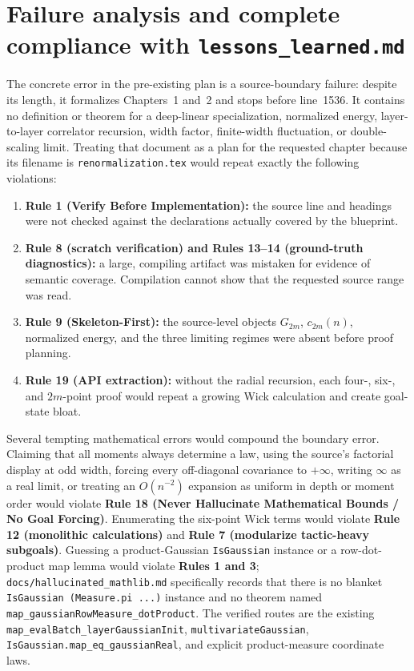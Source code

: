 \section{Failure analysis and complete compliance with \texttt{lessons\_learned.md}}

The concrete error in the pre-existing plan is a source-boundary failure: despite its length, it
formalizes Chapters~1 and~2 and stops before line~1536.  It contains no definition or theorem for a
deep-linear specialization, normalized energy, layer-to-layer correlator recursion, width factor,
finite-width fluctuation, or double-scaling limit.  Treating that document as a plan for the
requested chapter because its filename is \texttt{renormalization.tex} would repeat exactly the
following violations:
\begin{enumerate}
  \item \textbf{Rule 1 (Verify Before Implementation):} the source line and headings were not
    checked against the declarations actually covered by the blueprint.
  \item \textbf{Rule 8 (scratch verification) and Rules 13--14 (ground-truth diagnostics):} a
    large, compiling artifact was mistaken for evidence of semantic coverage.  Compilation cannot
    show that the requested source range was read.
  \item \textbf{Rule 9 (Skeleton-First):} the source-level objects $G_{2m}$, $c_{2m}(n)$,
    normalized energy, and the three limiting regimes were absent before proof planning.
  \item \textbf{Rule 19 (API extraction):} without the radial recursion, each four-, six-, and
    $2m$-point proof would repeat a growing Wick calculation and create goal-state bloat.
\end{enumerate}

Several tempting mathematical errors would compound the boundary error.  Claiming that all moments
always determine a law, using the source's factorial display at odd width, forcing every
off-diagonal covariance to $+\infty$, writing $\infty$ as a real limit, or treating an $O(n^{-2})$
expansion as uniform in depth or moment order would violate \textbf{Rule 18 (Never Hallucinate
Mathematical Bounds / No Goal Forcing)}.  Enumerating the six-point Wick terms would violate
\textbf{Rule 12 (monolithic calculations)} and \textbf{Rule 7 (modularize tactic-heavy subgoals)}.
Guessing a product-Gaussian \texttt{IsGaussian} instance or a row-dot-product map lemma would
violate \textbf{Rules 1 and 3}; \texttt{docs/hallucinated\_mathlib.md} specifically records that
there is no blanket \texttt{IsGaussian (Measure.pi ...)} instance and no theorem named
\texttt{map\_gaussianRowMeasure\_dotProduct}.  The verified routes are the existing
\texttt{map\_evalBatch\_layerGaussianInit}, \texttt{multivariateGaussian},
\texttt{IsGaussian.map\_eq\_gaussianReal}, and explicit product-measure coordinate laws.

